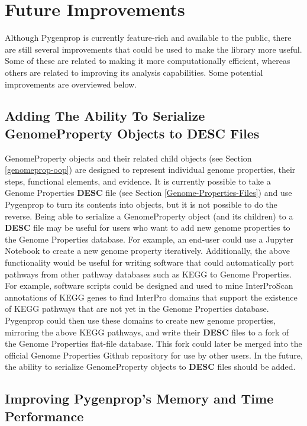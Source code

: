 \section{Future Improvements}

Although Pygenprop is currently feature-rich and available to the public, there are still several improvements that could be used to make the library more useful. Some of these are related to making it more computationally efficient, whereas others are related to improving its analysis capabilities. Some potential improvements are overviewed below.

\subsection{Adding The Ability To Serialize GenomeProperty Objects to DESC Files}

GenomeProperty objects and their related child objects (see Section \ref{genomeprop-oop}) are designed to represent individual genome properties, their steps, functional elements, and evidence. It is currently possible to take a Genome Properties \textbf{DESC} file (see Section \ref{Genome-Properties-Files}) and use Pygenprop to turn its contents into objects, but it is not possible to do the reverse. Being able to serialize a GenomeProperty object (and its children) to a \textbf{DESC} file may be useful for users who want to add new genome properties to the Genome Properties database. For example, an end-user could use a Jupyter Notebook \cite{kluyver2016jupyter} to create a new genome property iteratively. Additionally, the above functionality would be useful for writing software that could automatically port pathways from other pathway databases such as KEGG \cite{kanehisa2000kegg} to Genome Properties. For example, software scripts could be designed and used to mine InterProScan annotations of KEGG genes \cite{kanehisa2015kegg} to find InterPro domains that support the existence of KEGG pathways that are not yet in the Genome Properties database. Pygenprop could then use these domains to create new genome properties, mirroring the above KEGG pathways, and write their \textbf{DESC} files to a fork of the Genome Properties flat-file database. This fork could later be merged into the official Genome Properties Github repository for use by other users. In the future, the ability to serialize GenomeProperty objects to \textbf{DESC} files should be added.

\subsection{Improving Pygenprop's Memory and Time Performance}

